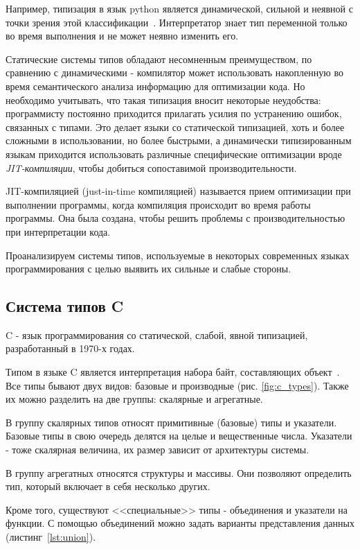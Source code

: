 Например, типизация в язык python является динамической, сильной и неявной с точки зрения этой классификации~\cite{PythonWiki}.
Интерпретатор знает тип переменной только во время выполнения и не может неявно изменить его.

Статические системы типов обладают несомненным преимуществом, по сравнению с динамическими - компилятор может использовать накопленную во время семантического анализа информацию для оптимизации кода.
Но необходимо учитывать, что такая типизация вносит некоторые неудобства: программисту постоянно приходится прилагать усилия по устранению ошибок, связанных с типами.
Это делает языки со статической типизацией, хоть и более сложными в использовании, но более быстрыми, а динамически типизированным языкам приходится использовать различные специфические оптимизации вроде \textit{JIT-компиляции}, чтобы добиться сопоставимой производительности.

JIT-компиляцией (just-in-time компиляцией) называется прием оптимизации при выполнении программы, когда компиляция происходит во время работы программы.
Она была создана, чтобы решить проблемы с производительностью при интерпретации кода.

Проанализируем системы типов, используемые в некоторых современных языках программирования с целью выявить их сильные и слабые стороны.

\subsection{Система типов C}
\label{subsec:c_type_system}

C - язык программирования со статической, слабой, явной типизацией, разработанный в 1970-х годах.

Типом в языке C является интерпретация набора байт, составляющих объект~\cite{CSpec}.
Все типы бывают двух видов: базовые и производные (рис. \ref{fig:c_types}).
Также их можно разделить на две группы: скалярные и агрегатные.

В группу скалярных типов относят примитивные (базовые) типы и указатели.
Базовые типы в свою очередь делятся на целые и вещественные числа.
Указатели - тоже скалярная величина, их размер зависит от архитектуры системы.

В группу агрегатных относятся структуры и массивы.
Они позволяют определить тип, который включает в себя несколько других.

Кроме того, существуют <<специальные>> типы - объединения и указатели на функции.
С помощью объединений можно задать варианты представления данных (листинг~\ref{lst:union}).


